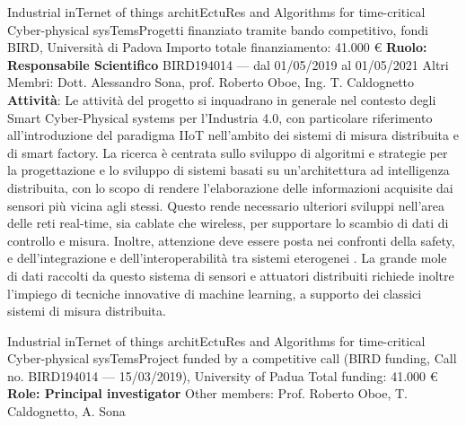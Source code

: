 {Industrial inTernet of things architEctuRes and Algorithms for time-critical Cyber-physical sysTems}{Progetti finanziato tramite bando competitivo, fondi BIRD, Università di Padova}
{\newline
    Importo totale finanziamento: 41.000 €\newline
    \textbf{Ruolo: Responsabile Scientifico}\newline
    BIRD194014 --- dal 01/05/2019 al 01/05/2021\newline
    Altri Membri: Dott. Alessandro Sona, prof. Roberto Oboe, Ing. T. Caldognetto}
{\textbf{Attività}: Le attività del progetto si inquadrano in generale nel contesto degli Smart Cyber-Physical systems per l'Industria 4.0, con particolare riferimento all'introduzione del paradigma IIoT nell'ambito dei sistemi di misura distribuita e di smart factory. La ricerca è centrata sullo sviluppo di algoritmi e strategie per la progettazione e lo sviluppo di sistemi basati su un'architettura ad intelligenza distribuita, con lo scopo di rendere l'elaborazione delle informazioni acquisite dai sensori più vicina agli stessi. Questo rende necessario ulteriori sviluppi nell'area delle reti real-time, sia cablate che wireless, per supportare lo scambio di dati di controllo e misura. Inoltre, attenzione deve essere posta nei confronti della safety, e dell'integrazione e dell'interoperabilità tra sistemi eterogenei \cite{Morato:2020a,Vitturi:2020}. La grande mole di dati raccolti da questo sistema di sensori e attuatori distribuiti richiede inoltre l'impiego di tecniche innovative di machine learning, a supporto dei classici sistemi di misura distribuita.}



            {Industrial inTernet of things architEctuRes and Algorithms for time-critical Cyber-physical sysTems}{Project funded by a competitive call (BIRD funding, Call no. BIRD194014 --- 15/03/2019), University of Padua}
            {\newline
            Total funding: 41.000 €\newline
            \textbf{Role: Principal investigator}\newline
            Other members: Prof. Roberto Oboe, T. Caldognetto, A. Sona}{}
            

